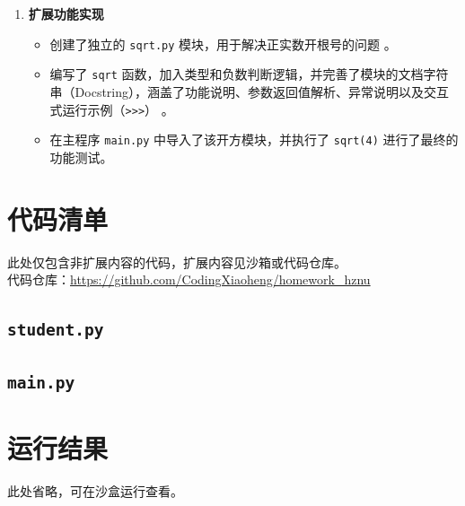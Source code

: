 \documentclass[12pt,a4paper]{ctexart}
\begin{document}
\begin{enumerate}
		\item \textbf{扩展功能实现} 
		\begin{itemize}
			\item 创建了独立的 \texttt{sqrt.py} 模块，用于解决正实数开根号的问题 。
			\item 编写了 \texttt{sqrt} 函数，加入类型和负数判断逻辑，并完善了模块的文档字符串（Docstring），涵盖了功能说明、参数返回值解析、异常说明以及交互式运行示例（\texttt{>>>}） 。
			\item 在主程序 \texttt{main.py} 中导入了该开方模块，并执行了 \texttt{sqrt(4)} 进行了最终的功能测试。
		\end{itemize}
	\end{enumerate}
	\section{代码清单}
	\noindent 此处仅包含非扩展内容的代码，扩展内容见沙箱或代码仓库。\\
	代码仓库：\url{https://github.com/CodingXiaoheng/homework_hznu}
	\subsection{\texttt{student.py}}
	
	
	\subsection{\texttt{main.py}}
	
	
	\section{运行结果}
	\noindent 此处省略，可在沙盒运行查看。
	
\end{document}
